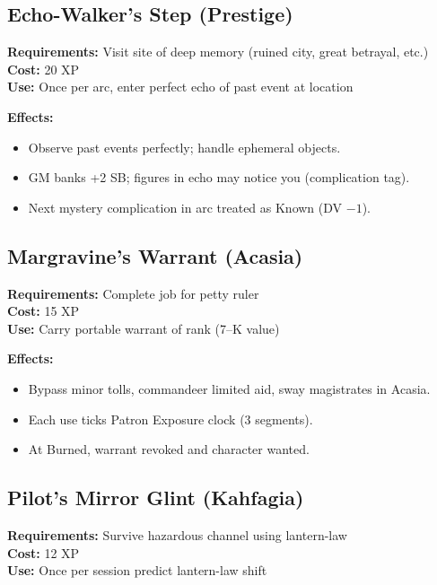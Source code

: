 \subsection{Echo-Walker's Step (Prestige)}
\label{subsec:echo-walker}

\textbf{Requirements:} Visit site of deep memory (ruined city, great betrayal, etc.)\\
\textbf{Cost:} 20 XP\\
\textbf{Use:} Once per arc, enter perfect echo of past event at location

\textbf{Effects:}
\begin{itemize}
\item Observe past events perfectly; handle ephemeral objects.
\item GM banks +2 SB; figures in echo may notice you (complication tag).
\item Next mystery complication in arc treated as Known (DV $-1$).
\end{itemize}

\subsection{Margravine's Warrant (Acasia)}
\label{subsec:margravine-warrant}

\textbf{Requirements:} Complete job for petty ruler\\
\textbf{Cost:} 15 XP\\
\textbf{Use:} Carry portable warrant of rank (7--K value)

\textbf{Effects:}
\begin{itemize}
\item Bypass minor tolls, commandeer limited aid, sway magistrates in Acasia.
\item Each use ticks Patron Exposure clock (3 segments).
\item At Burned, warrant revoked and character wanted.
\end{itemize}

\subsection{Pilot's Mirror Glint (Kahfagia)}
\label{subsec:pilot-mirror}

\textbf{Requirements:} Survive hazardous channel using lantern-law\\
\textbf{Cost:} 12 XP\\
\textbf{Use:} Once per session predict lantern-law shift

